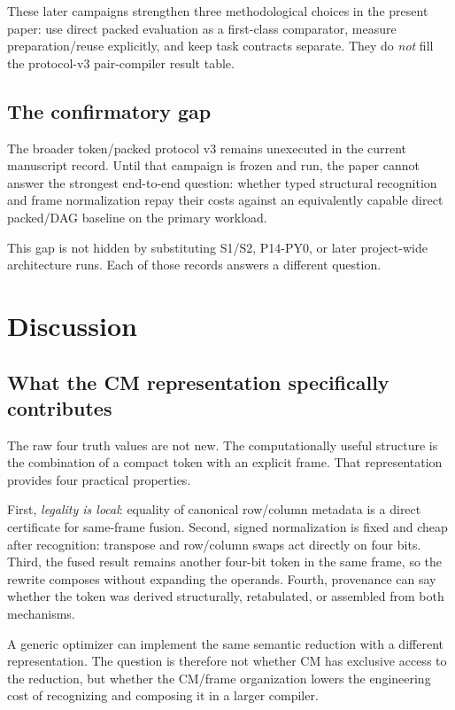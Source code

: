 \documentclass[10pt]{article}
\theoremstyle{plain}
\theoremstyle{definition}
\theoremstyle{remark}
\begin{document}
These later campaigns strengthen three methodological choices in the present paper: use direct packed evaluation as a first-class comparator, measure preparation/reuse explicitly, and keep task contracts separate. They do \emph{not} fill the protocol-v3 pair-compiler result table.

\subsection{The confirmatory gap}

The broader token/packed protocol v3 remains unexecuted in the current manuscript record. Until that campaign is frozen and run, the paper cannot answer the strongest end-to-end question: whether typed structural recognition and frame normalization repay their costs against an equivalently capable direct packed/DAG baseline on the primary workload.

This gap is not hidden by substituting S1/S2, P14-PY0, or later project-wide architecture runs. Each of those records answers a different question.

\section{Discussion}
\label{sec:discussion}

\subsection{What the CM representation specifically contributes}

The raw four truth values are not new. The computationally useful structure is the combination of a compact token with an explicit frame. That representation provides four practical properties.

First, \emph{legality is local}: equality of canonical row/column metadata is a direct certificate for same-frame fusion. Second, signed normalization is fixed and cheap after recognition: transpose and row/column swaps act directly on four bits. Third, the fused result remains another four-bit token in the same frame, so the rewrite composes without expanding the operands. Fourth, provenance can say whether the token was derived structurally, retabulated, or assembled from both mechanisms.

A generic optimizer can implement the same semantic reduction with a different representation. The question is therefore not whether CM has exclusive access to the reduction, but whether the CM/frame organization lowers the engineering cost of recognizing and composing it in a larger compiler.
\end{document}
